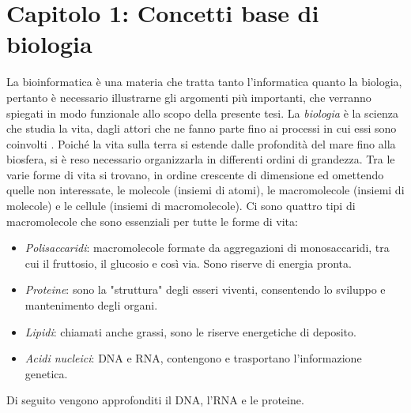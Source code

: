 \chapter{Capitolo 1: Concetti base di biologia}
La bioinformatica è una materia che tratta tanto l'informatica quanto la biologia, pertanto è necessario illustrarne gli argomenti più importanti, che verranno spiegati in modo funzionale allo scopo della presente tesi.
\newline
La \textit{biologia} è la scienza che studia la vita, dagli attori che ne fanno parte fino ai processi in cui essi sono coinvolti \cite{campbellBiology}. Poiché la vita sulla terra si estende dalle profondità del mare fino alla biosfera, si è reso necessario organizzarla in differenti ordini di grandezza. Tra le varie forme di vita si trovano,  in ordine crescente di dimensione ed omettendo quelle non interessate, le molecole (insiemi di atomi), le macromolecole (insiemi di molecole) e le cellule (insiemi di macromolecole).
\newline
Ci sono quattro tipi di macromolecole che sono essenziali per tutte le forme di vita:
\begin{itemize}
	\item \textit{Polisaccaridi}: macromolecole formate da aggregazioni di monosaccaridi, tra cui il fruttosio, il glucosio e così via. Sono riserve di energia pronta.
	\item \textit{Proteine}: sono la "struttura" degli esseri viventi, consentendo lo sviluppo e mantenimento degli organi.
	\item \textit{Lipidi}: chiamati anche grassi, sono le riserve energetiche di deposito.
	\item \textit{Acidi nucleici}: DNA e RNA, contengono e trasportano l'informazione genetica.
\end{itemize}
Di seguito vengono approfonditi il DNA, l'RNA e le proteine.
\newpage

